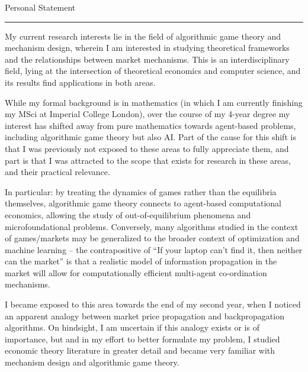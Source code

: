 \documentclass{article}
\newcommand{\soptitle}{Personal Statement}
\begin{document}
\begin{center}
\LARGE\soptitle%
\end{center}

\hrule

\bigskip

My current research interests lie in the field of algorithmic game theory and mechanism design, wherein I am interested in studying theoretical frameworks and the relationships between market mechanisms. This is an interdisciplinary field, lying at the intersection of theoretical economics and computer science, and its results find applications in both areas. 

\par\medskip

While my formal background is in mathematics (in which I am currently finishing my MSci at Imperial College London), over the course of my 4-year degree my interest has shifted away from pure mathematics towards agent-based problems, including algorithmic game theory but also AI. Part of the cause for this shift is that I was previously not exposed to these areas to fully appreciate them, and part is that I was attracted to the scope that exists for research in these areas, and their practical relevance.

\par\medskip

In particular: by treating the dynamics of games rather than the equilibria themselves, algorithmic game theory connects to agent-based computational economics, allowing the study of out-of-equilibrium phenomena and microfoundational problems. Conversely, many algorithms studied in the context of games/markets may be generalized to the broader context of optimization and machine learning -- the contrapositive of ``If your laptop can't find it, then neither can the market'' is that a realistic model of information propagation in the market will allow for computationally efficient multi-agent co-ordination mechanisms.

\par\medskip

I became exposed to this area towards the end of my second year, when I noticed an apparent analogy between market price propagation and backpropagation algorithms. On hindsight, I am uncertain if this analogy exists or is of importance, but and in my effort to better formulate my problem, I studied economic theory literature in greater detail and became very familiar with mechanism design and algorithmic game theory.
\end{document}
